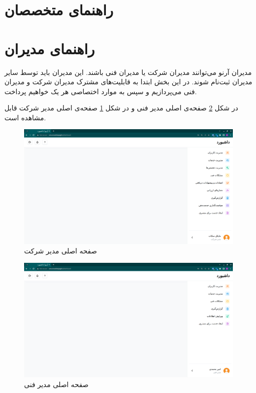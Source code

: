 \FloatBarrier
\section{راهنمای متخصصان}


\FloatBarrier
\section{راهنمای مدیران}

مدیران آرنو می‌توانند مدیران شرکت یا مدیران فنی باشند.
این مدیران باید توسط سایر مدیران ثبت‌نام شوند. 
در این بخش ابتدا به قابلیت‌های مشترک مدیران شرکت و مدیران فنی می‌پردازیم و سپس به موارد اختصاصی هر یک خواهیم پرداخت.

در شکل \ref{tm-dashboard} صفحه‌ی اصلی مدیر فنی و در شکل \ref{cm-dashboard} صفحه‌ی اصلی مدیر شرکت قابل مشاهده است.

\begin{figure}[h]
	\centering
	\includegraphics[width=\textwidth]{figs/user-guide/cm-dashboard}
	\caption{صفحه اصلی مدیر شرکت}
	\label{cm-dashboard}
\end{figure}

\begin{figure}[h]
	\centering
	\includegraphics[width=\textwidth]{figs/user-guide/tm-dashboard}
	\caption{صفحه اصلی مدیر فنی}
	\label{tm-dashboard}
\end{figure}

